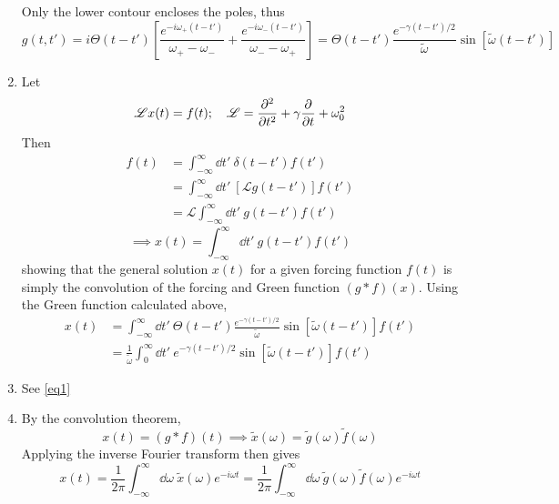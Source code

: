 \documentclass[12pt]{article}
\newcommand{\fullint}{\int_{-\infty}^\infty}
\newcommand{\fullintd}[1]{\fullint\dd#1\:}
\newcommand{\cint}[2]{\int_{#1}^{#2}}
\newcommand{\cintd}[3]{\cint{#1}{#2}\dd#3\:}
\begin{document}
\begin{enumerate}[label=(\alph*)]
\begin{center}
{
        }
    \end{center}
    Only the lower contour encloses the poles, thus
    \[ g(t,t') = i\Theta(t-t')\left[\frac{e^{-i\omega_+(t-t')}}{\omega_+ - \omega_-} + \frac{e^{-i\omega_-(t-t')}}{\omega_- - \omega_+}\right] = \boxed{\Theta(t-t')\frac{e^{-\gamma(t-t')/2}}{\tilde{\omega}}\sin[\tilde{\omega}(t-t')]} \]

    \item 
    Let 
    \[ \mathscr{L}x(t) = f(t); \quad \mathscr{L} = \pdv[2]{t} + \gamma\pdv{t} + \omega_0^2 \] 
    Then
    \begin{align*}
        f(t) &= \fullintd{t'}\delta(t-t')f(t') \\
        &= \fullintd{t'}\left[\mathscr{L}g(t-t')\right]f(t') \\
        &= \mathscr{L}\fullintd{t'}g(t-t')f(t')
    \end{align*}
    \[ \implies x(t) = \fullintd{t'}g(t-t')f(t') \]
    showing that the general solution $x(t)$ for a given forcing function $f(t)$ is simply the convolution of the forcing and Green function $(g*f)(x)$. Using the Green function calculated above,
    \begin{align*}
        x(t) &= \fullintd{t'}\Theta(t-t')\frac{e^{-\gamma(t-t')/2}}{\tilde{\omega}}\sin[\tilde{\omega}(t-t')]f(t') \\
        &= \frac{1}{\tilde{\omega}}\cintd{0}{\infty}{t'}e^{-\gamma(t-t')/2}\sin[\tilde{\omega}(t-t')]f(t')
    \end{align*}

    \item
    See \eqref{eq1}

    \item
    By the convolution theorem,
    \[ x(t) = (g*f)(t) \implies \tilde{x}(\omega) = \tilde{g}(\omega)\tilde{f}(\omega) \]
    Applying the inverse Fourier transform then gives
    \[ x(t) = \frac{1}{2\pi}\fullintd{\omega}\tilde{x}(\omega)e^{-i\omega t} = \frac{1}{2\pi}\fullintd{\omega}\tilde{g}(\omega)\tilde{f}(\omega)e^{-i\omega t} \]

\end{enumerate}
\end{document}
